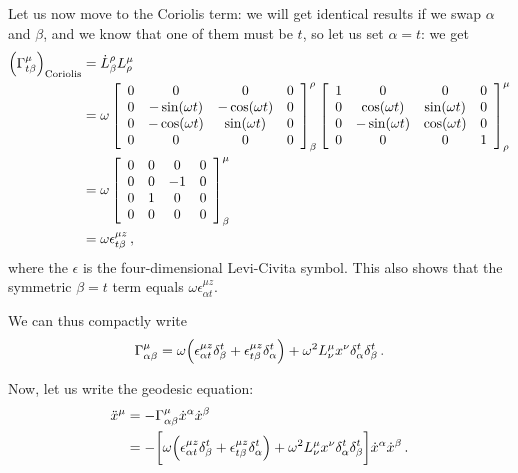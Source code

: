 \documentclass[main.tex]{subfiles}
\begin{document}
\begin{extracontent}
Let us now move to the Coriolis term: we will get identical results if we swap \(\alpha \) and \(\beta \), and we know that one of them must be \(t\), so let us set \(\alpha = t\): we get 
%
\begin{align}
\qty(\Gamma^{\mu }_{t \beta }) _{\text{Coriolis}} &= \dot{L}^{\rho }_{\beta } 
L^{\mu }_{\rho } \\
&= \omega \left[\begin{array}{cccc}
0 & 0 & 0 & 0 \\ 
0 & -\sin(\omega t) & -\cos(\omega t) & 0 \\ 
0 & -\cos(\omega t) & \sin(\omega t) & 0 \\ 
0 & 0 & 0 & 0
\end{array}\right]_{\beta }^{\rho }
\left[\begin{array}{cccc}
1 & 0 & 0 & 0 \\ 
0 & \cos(\omega t) & \sin(\omega t) & 0 \\ 
0 & -\sin(\omega t) & \cos(\omega t) & 0 \\ 
0 & 0 & 0 & 1
\end{array}\right]^{\mu }_{\rho }  \\
&= \omega \left[\begin{array}{cccc}
0 & 0 & 0 & 0 \\ 
0 & 0 & -1 & 0 \\ 
0 & 1 & 0 & 0 \\ 
0 & 0 & 0 & 0
\end{array}\right]^{\mu }_{\beta }  \\
&= \omega \epsilon^{\mu z}_{t \beta }
\,,
\end{align}
%
where the \(\epsilon \) is the four-dimensional Levi-Civita symbol. 
This also shows that the symmetric \(\beta = t \) term equals \(\omega \epsilon^{\mu z}_{\alpha t}\). 

We can thus compactly write 
%
\begin{align}
\Gamma^{\mu }_{\alpha \beta } = \omega \qty(\epsilon^{\mu z}_{\alpha t} \delta^{t}_{\beta } + \epsilon^{\mu z }_{t \beta } \delta^{t}_{\alpha  }) + \omega^2 L^{\mu }_{\nu }x^{\nu } \delta^{t}_{\alpha } \delta^{t}_{\beta }
\,.
\end{align}

Now, let us write the geodesic equation: 
%
\begin{align}
\ddot{x}^{\mu } &= - \Gamma^{\mu}_{\alpha \beta } \dot{x}^{\alpha } \dot{x}^{\beta }  \\
&= - \qty[\omega \qty(\epsilon^{\mu z}_{\alpha t} \delta^{t}_{\beta } + \epsilon^{\mu z }_{t \beta } \delta^{t}_{\alpha  }) + \omega^2 L^{\mu }_{\nu }x^{\nu } \delta^{t}_{\alpha } \delta^{t}_{\beta }] \dot{x}^{\alpha } \dot{x}^{\beta }
\,.
\end{align}

\end{extracontent}
\end{document}
